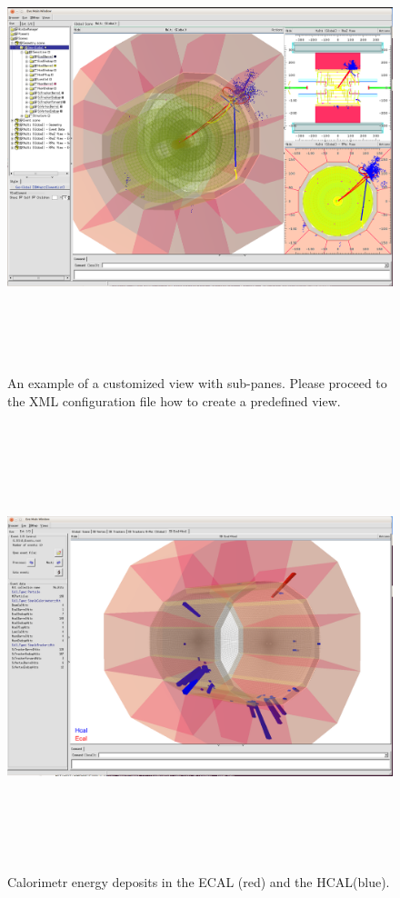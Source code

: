 \documentclass[10pt,a4paper]{article}
\begin{document}
\begin{figure}[h]
  \begin{center}
    \includegraphics[height=130mm] {DDEve_5.png}
    \caption{An example of a customized view with sub-panes. Please proceed 
               to the XML configuration file how to create a predefined view.}
    \label{fig:DDEve_5}
  \end{center}
\end{figure}

\newpage
\noindent
\begin{figure}[h]
  \begin{center}
    \includegraphics[height=130mm] {DDEve_7.png}
    \caption{Calorimetr energy deposits in the ECAL (red) and the HCAL(blue).}
    \label{fig:DDEve_5}
  \end{center}
\end{figure}
\end{document}
